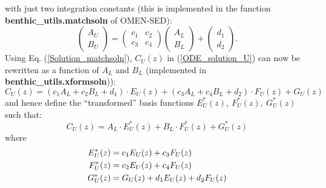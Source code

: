 \documentclass[gmd, manuscript]{copernicus}
\begin{document}
with just two integration constants (this is implemented in the function \textsf{\textbf{benthic\_utils.matchsoln}} of OMEN-SED): %
\begin{equation}
\begin{pmatrix} A_U \\ B_U \end{pmatrix} = \begin{pmatrix} c_1 & c_2 \\ c_3 & c_4 \end{pmatrix} \begin{pmatrix} A_L \\ B_L \end{pmatrix} + \begin{pmatrix} d_1 \\ d_2 \end{pmatrix} . \label{Solution_matchsoln} 
\end{equation}
Using Eq. (\ref{Solution_matchsoln}), $C_U(z)$ in (\ref{ODE_solution_U}) can now be rewritten as a function of $A_L$ and $B_L$ (implemented in  \textsf{\textbf{benthic\_utils.xformsoln}})):
\begin{equation}
 C_U(z) = (c_1 A_L + c_2 B_L + d_1) \cdot E_U(z) + (c_3 A_L + c_4 B_L + d_2) \cdot F_U(z) + G_U(z)  \label{Eq:Sol_Upper_rewritten}
\end{equation}
and hence define the ``transformed'' basis functions $E_U^*(z),\ F_U^*(z),\ G_U^*(z)$ such that:
\begin{equation}
 C_U(z) = A_L \cdot E_U^*(z) + B_L \cdot F_U^*(z) + G_U^*(z) \label{Solution_Upper_transformed_basis_fct}
\end{equation}
where
\begin{align}
 E_U^*(z) &= c_1 E_U(z) + c_3 F_U(z) \notag\\
 F_U^*(z) &= c_2 E_U(z) + c_4 F_U(z) \label{Solution_NEW_EFG}\\
 G_U^*(z) &= G_U(z) + d_1 E_U(z) + d_2 F_U(z) \notag
\end{align}
\end{document}
